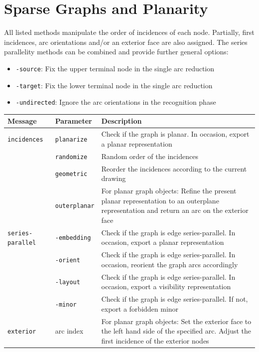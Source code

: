 \documentclass[a4paper,11pt,twoside]{book}
\begin{document}
\clearpage
{}
\section{Sparse Graphs and Planarity}
All listed methods manipulate the order of incidences of each node. Partially, first incidences, arc orientations
and/or an exterior face are also assigned.
The series parallelity methods can be combined and provide further general options:
\begin{itemize}
\item \verb/-source/: Fix the upper terminal node in the single arc reduction
\item \verb/-target/: Fix the lower terminal node in the single arc reduction
\item \verb/-undirected/: Ignore the arc orientations in the recognition phase
\end{itemize}

\bigskip
\begin{center}
\begin{tabular}{|p{3cm}|p{2cm}|p{19.5cm}|}
\hline
{\bf Message}       & {\bf Parameter} & {\bf Description} \\
\hline
\hline
\verb/incidences/   & \verb/planarize/
                    & Check if the graph is planar. In occasion, export a planar representation \\
                    & \verb/randomize/
                    & Random order of the incidences \\
                    & \verb/geometric/
                    & Reorder the incidences according to the current drawing \\
                    & \verb/outerplanar/
                    & For planar graph objects: Refine the present planar representation to an outerplane
                      representation and return an arc on the exterior face \\
\hline
\verb/series-parallel/  & \verb/-embedding/
                    & Check if the graph is edge series-parallel. In occasion, export a planar representation \\
                        & \verb/-orient/
                    & Check if the graph is edge series-parallel. In occasion, reorient the graph arcs accordingly \\
                        & \verb/-layout/
                    & Check if the graph is edge series-parallel. In occasion, export a visibility representation \\
                        & \verb/-minor/
                    & Check if the graph is edge series-parallel. If not, export a forbidden minor \\
\hline
\verb/exterior/     & arc index & For planar graph objects:
                        Set the exterior face to the left hand side of the
                        specified arc. Adjust the first incidence of the
                        exterior nodes \\
\hline
\end{tabular}
\end{center}
\end{document}
